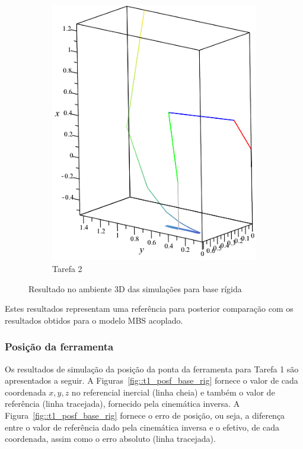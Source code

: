 \begin{figure}[h]
\begin{subfigure}[b]{0.40\textwidth}
        \includegraphics[width=\textwidth]{figs/t2_anima3D_base_rig}
        \caption{Tarefa 2}
        \label{fig::t2_anima3D_base_rig}
    \end{subfigure}
    \caption{Resultado no ambiente 3D das simulações para base rígida}
    \label{fig::anim3D_base_rig}
\end{figure}

Estes resultados representam uma referência para posterior comparação com os
resultados obtidos para o modelo MBS acoplado.


\subsubsection{Posição da ferramenta}

Os resultados de simulação da posição da ponta da ferramenta para Tarefa 1 são
apresentados a seguir. A Figuras~\ref{fig::t1_posf_base_rig} fornece o valor de
cada coordenada $x, y, z$ no referencial inercial (linha cheia) e também o valor
de referência (linha tracejada), fornecido pela cinemática inversa. A
Figura~\ref{fig::t1_posf_base_rig} fornece o erro de posição, ou seja, a
diferença entre o valor de referência dado pela cinemática inversa e o efetivo,
de cada coordenada, assim como o erro absoluto (linha tracejada).

